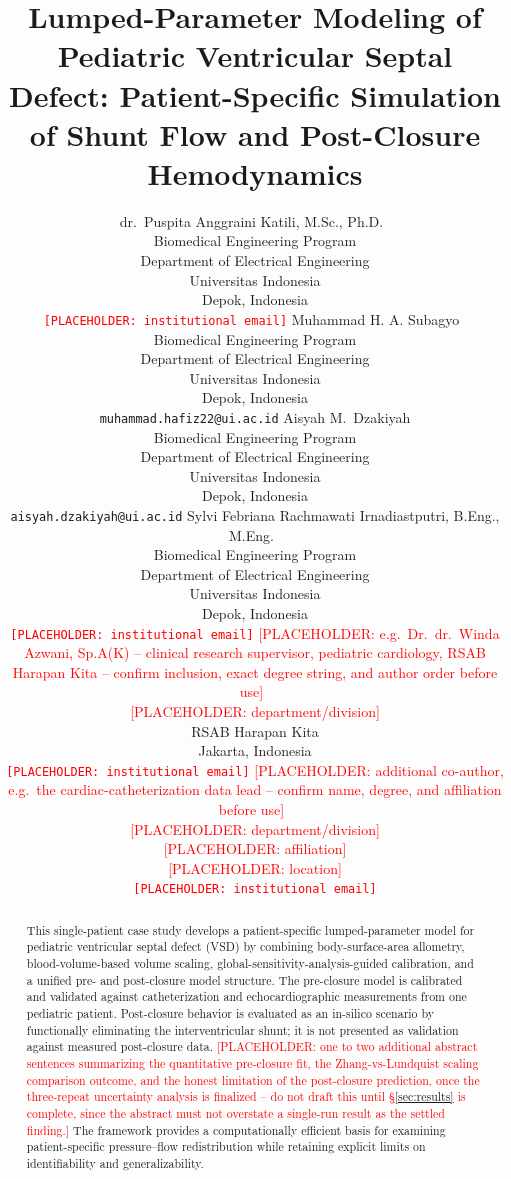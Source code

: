 \documentclass{article}
\title{Lumped-Parameter Modeling of Pediatric Ventricular Septal Defect: Patient-Specific Simulation of Shunt Flow and Post-Closure Hemodynamics}
\author{%
  dr.~Puspita Anggraini Katili, M.Sc., Ph.D.~\\
  Biomedical Engineering Program\\
  Department of Electrical Engineering\\
  Universitas Indonesia\\
  Depok, Indonesia \\
  \texttt{\textcolor{red}{[PLACEHOLDER: institutional email]}}
\And
  Muhammad H. A. Subagyo~\\
  Biomedical Engineering Program\\
  Department of Electrical Engineering\\
  Universitas Indonesia\\
  Depok, Indonesia \\
  \texttt{muhammad.hafiz22@ui.ac.id}
\And
  Aisyah M.~Dzakiyah\\
  Biomedical Engineering Program\\
  Department of Electrical Engineering\\
  Universitas Indonesia\\
  Depok, Indonesia \\
  \texttt{aisyah.dzakiyah@ui.ac.id}
\And
  Sylvi Febriana Rachmawati Irnadiastputri, B.Eng., M.Eng.~\\
  Biomedical Engineering Program\\
  Department of Electrical Engineering\\
  Universitas Indonesia\\
  Depok, Indonesia \\
  \texttt{\textcolor{red}{[PLACEHOLDER: institutional email]}}
\And
  \textcolor{red}{[PLACEHOLDER: e.g.\ Dr.~dr.~Winda Azwani, Sp.A(K) --
  clinical research supervisor, pediatric cardiology, RSAB Harapan Kita --
  confirm inclusion, exact degree string, and author order before use]}~\\
  \textcolor{red}{[PLACEHOLDER: department/division]}\\
  RSAB Harapan Kita\\
  Jakarta, Indonesia \\
  \texttt{\textcolor{red}{[PLACEHOLDER: institutional email]}}
\And
  \textcolor{red}{[PLACEHOLDER: additional co-author, e.g.\ the
  cardiac-catheterization data lead -- confirm name, degree, and
  affiliation before use]}~\\
  \textcolor{red}{[PLACEHOLDER: department/division]}\\
  \textcolor{red}{[PLACEHOLDER: affiliation]}\\
  \textcolor{red}{[PLACEHOLDER: location]} \\
  \texttt{\textcolor{red}{[PLACEHOLDER: institutional email]}}
}
\begin{document}
\maketitle


\begin{abstract}
This single-patient case study develops a patient-specific lumped-parameter model for pediatric ventricular septal defect (VSD) by combining body-surface-area allometry, blood-volume-based volume scaling, global-sensitivity-analysis-guided calibration, and a unified pre- and post-closure model structure. The pre-closure model is calibrated and validated against catheterization and echocardiographic measurements from one pediatric patient. Post-closure behavior is evaluated as an in-silico scenario by functionally eliminating the interventricular shunt; it is not presented as validation against measured post-closure data. \textcolor{red}{[PLACEHOLDER: one to two additional abstract sentences summarizing the quantitative pre-closure fit, the Zhang-vs-Lundquist scaling comparison outcome, and the honest limitation of the post-closure prediction, once the three-repeat uncertainty analysis is finalized -- do not draft this until \S\ref{sec:results} is complete, since the abstract must not overstate a single-run result as the settled finding.]} The framework provides a computationally efficient basis for examining patient-specific pressure--flow redistribution while retaining explicit limits on identifiability and generalizability.
\end{abstract}
\end{document}
